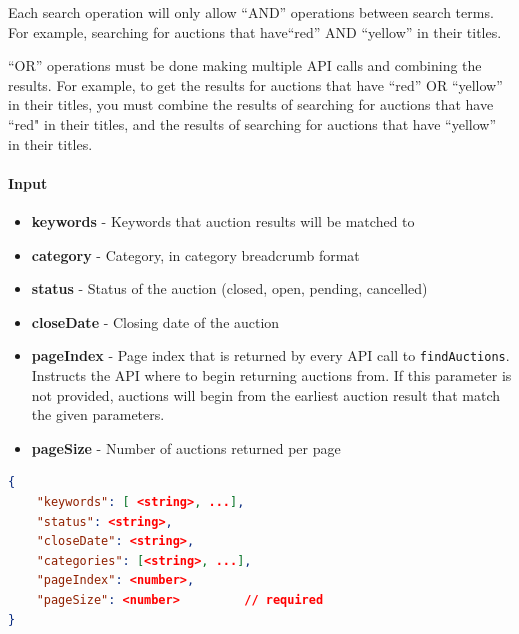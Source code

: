 \documentclass[12pt,a4paper]{article}
\begin{document}
\vspace{\baselineskip}
Each search operation will only allow ``AND'' operations between search terms. 
For example, searching for auctions that have``red'' AND ``yellow'' in their titles.
\vspace{\baselineskip}

``OR'' operations must be done making multiple API calls and combining the results.
For example, to get the results for auctions that have ``red'' OR ``yellow'' in their titles, 
you must combine the results of searching for auctions that have ``red" in their titles,
and the results of searching for auctions that have ``yellow'' in their titles.
\paragraph{Input} 

\begin{itemize}
    \item \textbf{keywords} - Keywords that auction results will be matched to
    \item \textbf{category} - Category, in category breadcrumb format
    \item \textbf{status} - Status of the auction (closed, open, pending, cancelled)
    \item \textbf{closeDate} - Closing date of the auction
    \item \textbf{pageIndex} - Page index that is returned by every API call to \texttt{findAuctions}. 
                                Instructs the API where to begin returning auctions from. 
                                If this parameter is not provided, auctions will begin from the earliest auction result
                                that match the given parameters.
    \item \textbf{pageSize} - Number of auctions returned per page
\end{itemize}

\begin{lstlisting}[language=json,numbers=none]
{
    "keywords": [ <string>, ...], 
    "status": <string>, 
    "closeDate": <string>,
    "categories": [<string>, ...], 
    "pageIndex": <number>, 
    "pageSize": <number>         // required
}
\end{lstlisting}


\pagebreak
\end{document}

